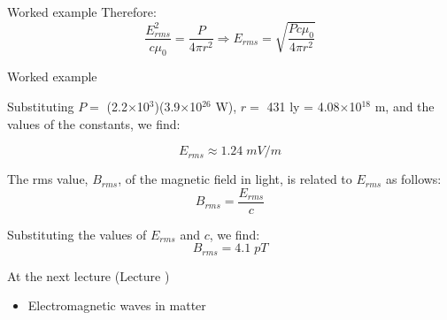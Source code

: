 {\begin{frame}{Worked example}
  Therefore:
  \begin{equation*}
    \frac{E_{rms}^2}{c\mu_0} = \frac{P}{4\pi r^2} \Rightarrow
     E_{rms} = \sqrt{\frac{P c\mu_0}{4\pi r^2}}
  \end{equation*}

\end{frame}

%
%
%

\begin{frame}{Worked example}

  Substituting $P = $ (2.2$\times$10$^3$)(3.9$\times$10$^{26}$ W),
  $r = $ 431 ly = 4.08$\times$10$^{18}$ m, and the values of the constants,
  we find:

  \begin{equation*}
     E_{rms} \approx 1.24 \; mV/m
  \end{equation*}

  The rms value, $B_{rms}$, of the magnetic field in light, is related
  to $E_{rms}$ as follows:
  \begin{equation*}
     B_{rms} = \frac{E_{rms}}{c}
  \end{equation*}

  Substituting the values of $E_{rms}$ and $c$, we find:
  \begin{equation*}
     B_{rms} = 4.1 \; pT
  \end{equation*}


\end{frame}

} %


%
%

\renewcommand{\lecturesummarytitle}{Main points to remember }



%
%

\begin{frame}{At the next lecture (Lecture \nextlecture)}

\begin{itemize}
\item Electromagnetic waves in matter
\end{itemize}

\end{frame}

%
%



